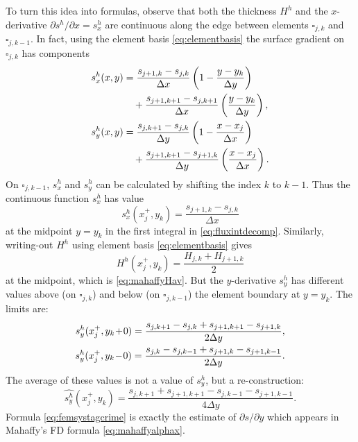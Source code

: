 \documentclass[review,letterpaper]{igs}
\begin{document}
To turn this idea into formulas, observe that both the thickness $H^h$ and the $x$-derivative $\partial s^h/\partial x = s^h_x$ are continuous along the edge between elements $\square_{j,k}$ and $\square_{j,k-1}$.  In fact, using the element basis \eqref{eq:elementbasis} the surface gradient on $\square_{j,k}$ has components
\begin{align}
s^h_x(x,y) &= \frac{s_{j+1,k}-s_{j,k}}{\Delta x} \left(1-\frac{y-y_k}{\Delta y}\right)  \label{eq:grads} \\
   &\quad + \frac{s_{j+1,k+1}-s_{j,k+1}}{\Delta x} \left(\frac{y-y_k}{\Delta y}\right), \notag \\
s^h_y(x,y) &= \frac{s_{j,k+1}-s_{j,k}}{\Delta y} \left(1-\frac{x-x_j}{\Delta x}\right) \notag \\
   &\quad + \frac{s_{j+1,k+1}-s_{j+1,k}}{\Delta y} \left(\frac{x-x_j}{\Delta x}\right). \notag
\end{align}
On $\square_{j,k-1}$, $s^h_x$ and $s^h_y$ can be calculated by shifting the index $k$ to $k-1$.  Thus the continuous function $s^h_x$ has value
\begin{equation}
s^h_x(x_j^+,y_k) = \frac{s_{j+1,k}-s_{j,k}}{\Delta x} \label{eq:femsxstag}
\end{equation}
at the midpoint $y=y_k$ in the first integral in \eqref{eq:fluxintdecomp}.  Similarly, writing-out $H^h$ using element basis \eqref{eq:elementbasis} gives
\begin{equation}
H^h(x_j^+,y_k) = \frac{H_{j,k}+H_{j+1,k}}{2} \label{eq:femHstag}
\end{equation}
at the midpoint, which is \eqref{eq:mahaffyHav}.  But the $y$-derivative $s^h_y$ has different values above (on $\square_{j,k}$) and below (on $\square_{j,k-1}$) the element boundary at $y = y_k$.  The limits are:
\begin{align}
s^h_y(x_j^+,y_k\!+\!0) = \frac{s_{j,k+1}-s_{j,k} + s_{j+1,k+1}-s_{j+1,k}}{2\Delta y}, \\
s^h_y(x_j^+,y_k\!-\!0) = \frac{s_{j,k}-s_{j,k-1} + s_{j+1,k}-s_{j+1,k-1}}{2\Delta y}. \notag
\end{align}
The average of these values is not a value of $s_y^h$, but a re-construction:
\begin{equation}
\widehat{s^h_y}(x_j^+,y_k) = \frac{s_{j,k+1} + s_{j+1,k+1} - s_{j,k-1} - s_{j+1,k-1}}{4\Delta y}. \label{eq:femsystagcrime}
\end{equation}
Formula \eqref{eq:femsystagcrime} is exactly the estimate of $\partial s/\partial y$ which appears in Mahaffy's FD formula \eqref{eq:mahaffyalphax}.
\end{document}
